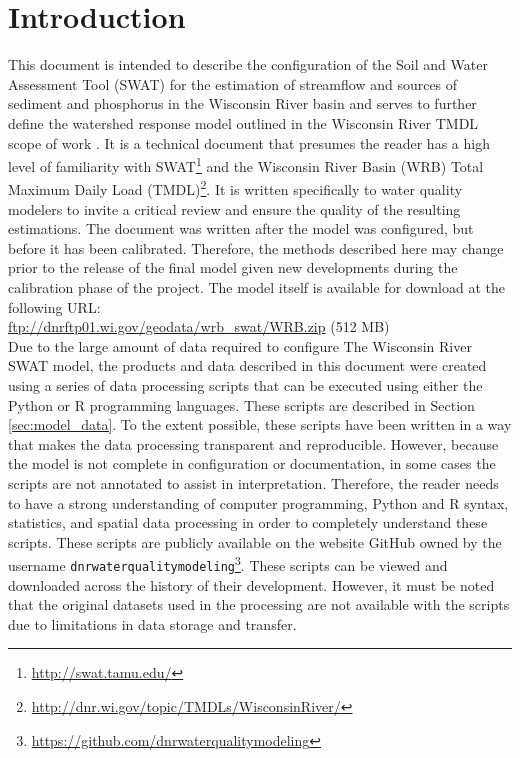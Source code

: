 \section{Introduction}
This document is intended to describe the configuration of the Soil and
Water Assessment Tool (SWAT) \citep{arnold_swat_1994} for the estimation of streamflow and sources
of sediment and phosphorus in the Wisconsin River basin and serves to further define the watershed response model 
outlined in the Wisconsin River TMDL scope of work . It is a technical
document that presumes the reader has a high level of familiarity with SWAT\footnote{\url{http://swat.tamu.edu/}} and
the Wisconsin River Basin (WRB) Total Maximum Daily Load (TMDL)\footnote{\url{http://dnr.wi.gov/topic/TMDLs/WisconsinRiver/}}.
It is written specifically to water quality
modelers to invite a critical review and ensure the quality of the resulting
estimations. The document was written after the model was configured, but before
it has been calibrated. Therefore, the methods described here may change prior
to the release of the final model given new developments during the calibration
phase of the project. The model itself is available for download at the following URL: \\

\url{ftp://dnrftp01.wi.gov/geodata/wrb_swat/WRB.zip} (512 MB)\\

Due to the large amount of data required to configure The Wisconsin River SWAT model, the
products and data described in this document were created using a series of data 
processing scripts
that can be executed using either the Python or R programming languages. These scripts
are described in Section \ref{sec:model_data}. To the
extent possible, these scripts have been written in a way that makes
the data processing transparent and reproducible. However, because the model is
not complete in configuration or documentation, in some cases the scripts are not
annotated to assist in interpretation. Therefore, the reader needs to have a
strong understanding of computer programming, Python and R syntax, statistics,
and spatial data processing in order to completely understand these scripts. These scripts are publicly available on the
website GitHub owned by the username
\texttt{dnrwaterqualitymodeling}\footnote{\url{https://github.com/dnrwaterqualitymodeling}}. 
These scripts can be viewed and downloaded
across the history of their development. However, it must be noted that the
original datasets used in the processing are not available with the scripts due
to limitations in data storage and transfer.

